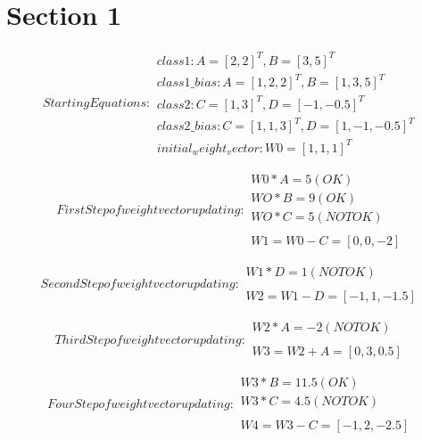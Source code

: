 \documentclass{report}
\begin{document}
\chapter{Section 1}

\begin{subequations}
  Starting Equations:
  \begin{flalign*}
    class1: A = [2, 2]^T, B = [3, 5]^T \\
    class1\_bias: A = [1, 2, 2]^T, B = [1, 3, 5]^T \\
    class2: C = [1, 3]^T, D = [-1, -0.5]^T \\
    class2\_bias: C = [1, 1, 3]^T, D = [1, -1, -0.5]^T \\
    initial_weight_vector: W0 = [1, 1, 1]^T
  \end{flalign*}
\end{subequations}

\begin{subequations}
  First Step of weight vector updating:
  \begin{flalign*}
    W0 * A = 5 (OK) \\
    WO * B = 9 (OK) \\
    WO * C = 5 (NOT OK) \\
    \\
    W1 = W0 - C = [0, 0, -2]
  \end{flalign*}
\end{subequations}

\begin{subequations}
  Second Step of weight vector updating:
  \begin{flalign*}
    W1 * D = 1 (NOT OK) \\
    \\
    W2 = W1 - D = [-1, 1, -1.5]
  \end{flalign*}
\end{subequations}

\begin{subequations}
  Third Step of weight vector updating:
  \begin{flalign*}
    W2 * A = -2 (NOT OK) \\
    \\
    W3 = W2 + A = [0, 3, 0.5]
  \end{flalign*}
\end{subequations}

\begin{subequations}
  Four Step of weight vector updating:
  \begin{flalign*}
    W3 * B = 11.5 (OK) \\
    W3 * C = 4.5 (NOT OK) \\
    \\
    W4 = W3 - C = [-1, 2, -2.5]
  \end{flalign*}
\end{subequations}
\end{document}
